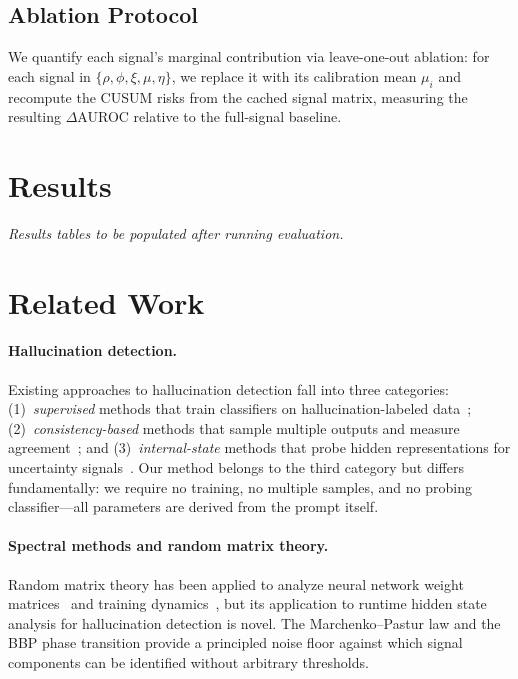 \documentclass{article}
\begin{document}
\subsection{Ablation Protocol}

We quantify each signal's marginal contribution via leave-one-out ablation: for each signal in $\{\rho, \phi, \xi, \mu, \eta\}$, we replace it with its calibration mean $\mu_i$ and recompute the CUSUM risks from the cached signal matrix, measuring the resulting $\Delta$AUROC relative to the full-signal baseline.


\section{Results}
\label{sec:results}

\emph{Results tables to be populated after running evaluation.}


\section{Related Work}
\label{sec:related}

\paragraph{Hallucination detection.}
Existing approaches to hallucination detection fall into three categories: (1)~\emph{supervised} methods that train classifiers on hallucination-labeled data~\citep{manakul2023selfcheckgpt}; (2)~\emph{consistency-based} methods that sample multiple outputs and measure agreement~\citep{kuhn2023semantic}; and (3)~\emph{internal-state} methods that probe hidden representations for uncertainty signals~\citep{azaria2023internal, burns2022discovering}. Our method belongs to the third category but differs fundamentally: we require no training, no multiple samples, and no probing classifier---all parameters are derived from the prompt itself.

\paragraph{Spectral methods and random matrix theory.}
Random matrix theory has been applied to analyze neural network weight matrices~\citep{martin2021implicit} and training dynamics~\citep{papyan2020prevalence}, but its application to runtime hidden state analysis for hallucination detection is novel. The Marchenko--Pastur law and the BBP phase transition provide a principled noise floor against which signal components can be identified without arbitrary thresholds.
\end{document}
